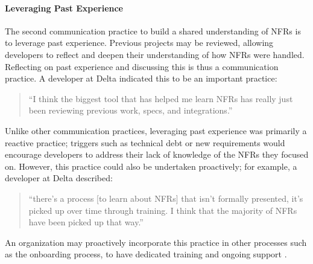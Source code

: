 \documentclass[smallextended]{svjour3}
\begin{document}
\paragraph{Leveraging Past Experience} The second communication practice to build a shared understanding of NFRs is to leverage past experience. 
Previous projects may be reviewed, allowing developers to reflect and deepen their understanding of how NFRs were handled. Reflecting on past experience and discussing this is thus a communication practice.
A developer at Delta indicated this to be an important practice:
\begin{quote}
    ``I think the biggest tool that has helped me learn NFRs has really just been reviewing previous work, specs, and integrations.''
\end{quote}    

Unlike other communication practices, leveraging past experience was primarily a \textmd{reactive} practice; triggers such as technical debt or new requirements would encourage developers to address their lack of knowledge of the NFRs they focused on. However, this practice could also be undertaken proactively; for example, a developer at Delta described:
\begin{quote}
    ``there's a process [to learn about NFRs] that isn't formally presented, it's picked up over time through training. I think that the majority of NFRs have been picked up that way.'' 
\end{quote}    
An organization may proactively incorporate this practice in other processes such as the onboarding process, to have dedicated training and ongoing support \citep{sharma2020onboarding}.
\end{document}

